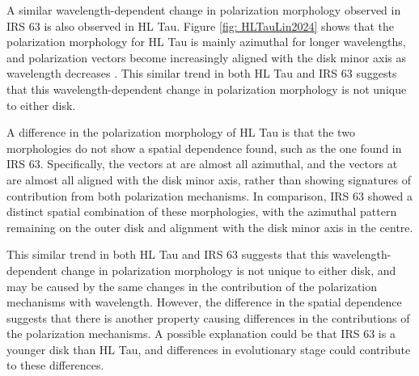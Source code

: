 


A similar wavelength-dependent change in polarization morphology observed in IRS 63 is also observed in HL Tau. Figure \ref{fig: HLTauLin2024} shows that the polarization morphology for HL Tau is mainly azimuthal for longer wavelengths, and polarization vectors become increasingly aligned with the disk minor axis as wavelength decreases \citep{Stephens_2017, Li2024}. This similar trend in both HL Tau and IRS 63 suggests that this wavelength-dependent change in polarization morphology is not unique to either disk. 

A difference in the polarization morphology of HL Tau is that the two morphologies do not show a spatial dependence found, such as the one found in IRS 63. Specifically, the vectors at \bfour are almost all azimuthal, and the vectors at \bseven are almost all aligned with the disk minor axis, rather than showing signatures of contribution from both polarization mechanisms. In comparison, IRS 63 showed a distinct spatial combination of these morphologies, with the azimuthal pattern remaining on the outer disk and alignment with the disk minor axis in the centre. 

 
This similar trend in both HL Tau and IRS 63 suggests that this wavelength-dependent change in polarization morphology is not unique to either disk, and may be caused by the same changes in the contribution of the polarization mechanisms with wavelength. However, the difference in the spatial dependence suggests that there is another property causing differences in the contributions of the polarization mechanisms. A possible explanation could be that IRS 63 is a younger disk than HL Tau, and differences in evolutionary stage could contribute to these differences. 
